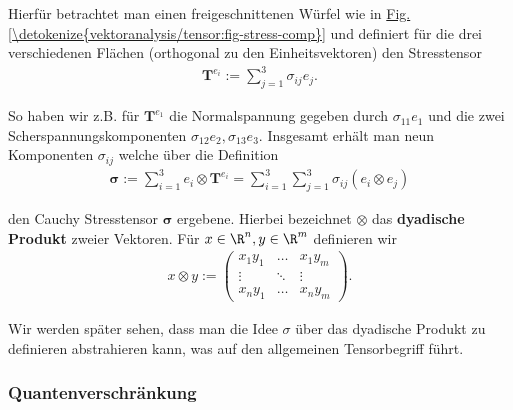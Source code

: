 \par
Hierfür betrachtet man einen freigeschnittenen Würfel wie in \hyperref[\detokenize{vektoranalysis/tensor:fig-stress-comp}]{Fig.\@ \ref{\detokenize{vektoranalysis/tensor:fig-stress-comp}}} und definiert für die drei verschiedenen Flächen (orthogonal zu den Einheitsvektoren) den Stresstensor
\begin{align*}
\mathbf{T}^{e_i}:= \sum_{j=1}^3 \sigma_{ij} e_j.
\end{align*}
\par
So haben wir z.B. für \(\mathbf{T}^{e_1}\) die Normalspannung gegeben durch \(\sigma_{11} e_1\) und die zwei Scherspannungskomponenten \(\sigma_{12} e_2, \sigma_{13} e_3\). Insgesamt erhält man neun Komponenten \(\sigma_{ij}\) welche über die Definition
\begin{align*}
\mathbf{\sigma} := \sum_{i=1}^3 e_i \otimes \mathbf{T}^{e_i} = \sum_{i=1}^3\sum_{j=1}^3 \sigma_{ij} (e_i\otimes e_j)
\end{align*}
\par
den Cauchy Stresstensor \(\mathbf{\sigma}\) ergebene. Hierbei bezeichnet \(\otimes\) das \textbf{dyadische Produkt} zweier Vektoren. Für \(x\in\R^n,y\in\R^m\) definieren wir
\begin{align*}
x \otimes y := 
\begin{pmatrix}
x_1y_1 &\ldots &x_1 y_m\\
\vdots &\ddots & \vdots\\
x_n y_1&\ldots& x_n y_m
\end{pmatrix}.
\end{align*}
\par
Wir werden später sehen, dass man die Idee \(\sigma\) über das dyadische Produkt zu definieren abstrahieren kann, was auf den allgemeinen Tensorbegriff führt.


\subsubsection{Quantenverschränkung}
\label{\detokenize{vektoranalysis/tensor:quantenverschrankung}}

